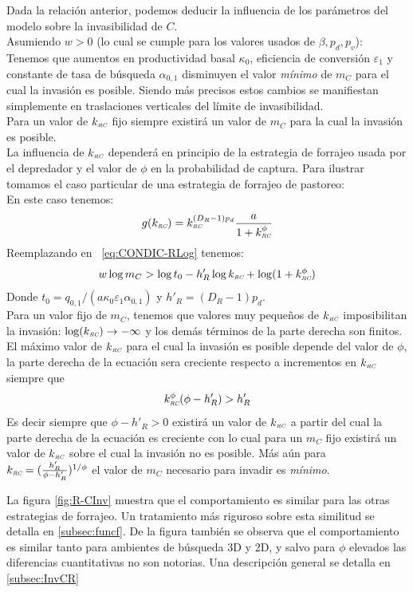 Dada la relaci\'on anterior, podemos deducir la influencia de los par\'ametros del modelo sobre la invasibilidad de $C$.\\
Asumiendo $w > 0$ (lo cual se cumple para los valores usados de $\beta, p_d, p_v$): \\
Tenemos que aumentos en productividad basal $\kappa_0$, eficiencia de conversi\'on $\varepsilon_1$ y constante de tasa de b\'usqueda $\alpha_{0,1}$ disminuyen el valor \emph{m\'inimo} de $m_C$ para el cual la invasi\'on es posible. Siendo m\'as precisos estos cambios se manifiestan simplemente en traslaciones verticales del l\'imite de invasibilidad.\\
Para un valor de $k_{\textit{\tiny RC}}$ fijo siempre existir\'a un valor de $m_C$ para la cual la invasi\'on es posible.\\
La influencia de $k_{\textit{\tiny RC}}$ depender\'a en principio de la estrategia de forrajeo usada por el depredador y el valor de $\phi$ en la probabilidad de captura. Para ilustrar tomamos el caso particular de una estrategia de forrajeo de pastoreo:\\
En este caso tenemos:
\[ g(k_{\textit{\tiny RC}}) = k_{\textit{\tiny RC}}^{(D_R -1)p_d} \frac{a}{1+k_{\textit{\tiny RC}}^\phi} \]
Reemplazando en ~\eqref{eq:CONDIC-RLog} tenemos:
\begin{equation}
  \label{eq:CONIC-RLOGGRAZING}
  w \log m_C > \log{t_0} - h'_R\log{k_{\textit{\tiny RC}}} + \log(1+k_{\textit{\tiny RC}}^\phi)
\end{equation}
Donde $t_0 = q_{0,1} / (a \kappa_0 \varepsilon_1 \alpha_{0,1})$ y $h'_R = (D_R -1)p_d$.\\
Para un valor fijo de $m_C$, tenemos que valores muy peque\~nos de $k_{\textit{\tiny RC}}$ imposibilitan la invasi\'on: $\log(k_{\textit{\tiny RC}}) \to -\infty$ y los dem\'as t\'erminos de la parte derecha son finitos. El m\'aximo valor de $k_{\textit{\tiny RC}}$ para el cual la invasi\'on es posible depende del valor de $\phi$, la parte derecha de la ecuaci\'on sera creciente respecto a incrementos en $k_{\textit{\tiny RC}}$ siempre que
\begin{equation}
  \label{eq:ROCKRCIC-R}
  k_{\textit{\tiny RC}}^\phi(\phi - h'_R) > h'_R
\end{equation}
Es decir siempre que $\phi - h'_R > 0$ existir\'a un valor de $k_{\textit{\tiny RC}}$ a partir del cual la parte derecha de la ecuaci\'on es creciente con lo cual para un $m_C$ fijo existir\'a un valor de $k_{\textit{\tiny RC}}$ sobre el cual la invasi\'on no es posible. M\'as a\'un para $k_{\textit{\tiny RC}} = (\frac{h'_R}{\phi - h'_R})^{1/\phi}$ el valor de $m_C$ necesario para invadir es \emph{m\'inimo}.

La figura \ref{fig:R-CInv} muestra que el comportamiento es similar para las otras estrategias de forrajeo. Un tratamiento m\'as riguroso sobre esta similitud se detalla en \ref{subsec:funcf}.  De la figura tambi\'en se observa que el comportamiento es similar tanto para ambientes de b\'usqueda 3D y 2D, y salvo para $\phi$ elevados las diferencias cuantitativas no son notorias. Una descripci\'on general se detalla en  \ref{subsec:InvCR}

